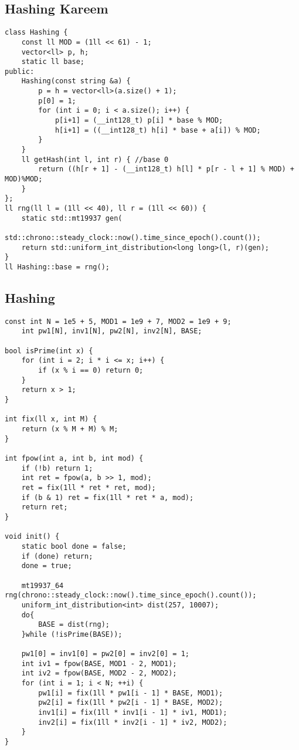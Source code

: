 {\subsection{Hashing Kareem}

\begin{lstlisting}[style=cpp]
class Hashing {
    const ll MOD = (1ll << 61) - 1;
    vector<ll> p, h;
    static ll base;
public:
    Hashing(const string &a) {
        p = h = vector<ll>(a.size() + 1);
        p[0] = 1;
        for (int i = 0; i < a.size(); i++) {
            p[i+1] = (__int128_t) p[i] * base % MOD;
            h[i+1] = ((__int128_t) h[i] * base + a[i]) % MOD;
        }
    }
    ll getHash(int l, int r) { //base 0
        return ((h[r + 1] - (__int128_t) h[l] * p[r - l + 1] % MOD) + MOD)%MOD;
    }
};
ll rng(ll l = (1ll << 40), ll r = (1ll << 60)) {
    static std::mt19937 gen(
            std::chrono::steady_clock::now().time_since_epoch().count());
    return std::uniform_int_distribution<long long>(l, r)(gen);
}
ll Hashing::base = rng();
\end{lstlisting}

\subsection{Hashing}

\begin{lstlisting}[style=cpp]
const int N = 1e5 + 5, MOD1 = 1e9 + 7, MOD2 = 1e9 + 9;
	int pw1[N], inv1[N], pw2[N], inv2[N], BASE;

bool isPrime(int x) {
    for (int i = 2; i * i <= x; i++) {
        if (x % i == 0) return 0;
    }
    return x > 1;
}

int fix(ll x, int M) {
    return (x % M + M) % M;
}

int fpow(int a, int b, int mod) {
    if (!b) return 1;
    int ret = fpow(a, b >> 1, mod);
    ret = fix(1ll * ret * ret, mod);
    if (b & 1) ret = fix(1ll * ret * a, mod);
    return ret;
}

void init() {
    static bool done = false;
    if (done) return;
    done = true;
    
    mt19937_64 rng(chrono::steady_clock::now().time_since_epoch().count());
    uniform_int_distribution<int> dist(257, 10007);
    do{
        BASE = dist(rng);
    }while (!isPrime(BASE));

    pw1[0] = inv1[0] = pw2[0] = inv2[0] = 1;
    int iv1 = fpow(BASE, MOD1 - 2, MOD1);
    int iv2 = fpow(BASE, MOD2 - 2, MOD2);
    for (int i = 1; i < N; ++i) {
        pw1[i] = fix(1ll * pw1[i - 1] * BASE, MOD1);
        pw2[i] = fix(1ll * pw2[i - 1] * BASE, MOD2);
        inv1[i] = fix(1ll * inv1[i - 1] * iv1, MOD1);
        inv2[i] = fix(1ll * inv2[i - 1] * iv2, MOD2);
    }
}


\end{lstlisting}}
